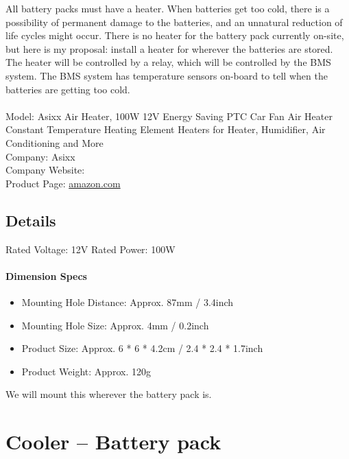 All battery packs must have a heater. When batteries get too cold, there is a possibility of permanent damage to the batteries, and an unnatural reduction of life cycles might occur. There is no heater for the battery pack currently on-site, but here is my proposal: install a heater for wherever the batteries are stored. The heater will be controlled by a relay, which will be controlled by the BMS system. The BMS system has temperature sensors on-board to tell when the batteries are getting too cold. \\
 \\
Model: Asixx Air Heater, 100W 12V Energy Saving PTC Car Fan Air Heater Constant Temperature Heating Element Heaters for Heater, Humidifier, Air Conditioning and More \\
Company: Asixx \\
Company Website: \\
Product Page: \href{https://www.amazon.com/Asixx-Constant-Temperature-Humidifier-Conditioning/dp/B07HCB95SJ/ref=asc_df_B07HCB95SJ/?tag=hyprod-20&linkCode=df0&hvadid=309851778232&hvpos=1o1&hvnetw=g&hvrand=4833336270821486334&hvpone=&hvptwo=&hvqmt=&hvdev=c&hvdvcmdl=&hvlocint=&hvlocphy=9061320&hvtargid=pla-574478162578&psc=1}{amazon.com} \\

\subsection{Details}

Rated Voltage: 12V
Rated Power: 100W

\paragraph{Dimension Specs}
\begin{itemize}
	\item Mounting Hole Distance: Approx. 87mm / 3.4inch
	\item Mounting Hole Size: Approx. 4mm / 0.2inch
	\item Product Size: Approx. 6 * 6 * 4.2cm / 2.4 * 2.4 * 1.7inch
	\item Product Weight: Approx. 120g
\end{itemize}
\par

We will mount this wherever the battery pack is.

\section{Cooler – Battery pack}
